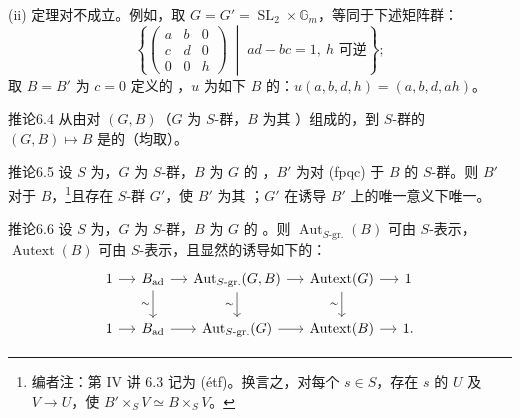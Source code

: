 (ii) 定理对不成立。例如，取 $G=G'=\operatorname{SL}_2\times\mathbb G_m$，等同于下述矩阵群：
\[\left\{\begin{pmatrix}a&b&0\\c&d&0\\0&0&h\end{pmatrix}\;\middle|\;ad-bc=1,\ h\text{ 可逆}\right\};\]
取 $B=B'$ 为 $c=0$ 定义的 ，$u$ 为如下 $B$ 的：$u(a,b,d,h)=(a,b,d,ah)$。
\begin{SGAresult}{推论}{6.4}
从由对 $(G,B)$（$G$ 为 $S$-群，$B$ 为其 ）组成的，到 $S$-群的 $(G,B)\mapsto B$ 是的（均取）。
\end{SGAresult}
\begin{SGAresult}{推论}{6.5}
设 $S$ 为，$G$ 为 $S$-群，$B$ 为 $G$ 的 ，$B'$ 为对 (fpqc) 于 $B$ 的 $S$-群。则 $B'$ 对于 $B$，\footnote{编者注：第 IV 讲 6.3 记为 (étf)。换言之，对每个 $s\in S$，存在 $s$ 的 $U$ 及 $V\to U$，使 $B'\times_SV\simeq B\times_SV$。}且存在 $S$-群 $G'$，使 $B'$ 为其 ；$G'$ 在诱导 $B'$ 上的唯一意义下唯一。
\end{SGAresult}
\begin{SGAresult}{推论}{6.6}
设 $S$ 为，$G$ 为 $S$-群，$B$ 为 $G$ 的 。则 $\operatorname{Aut}_{S\text{-gr.}}(B)$ 可由 $S$-表示，$\operatorname{Autext}(B)$ 可由 $S$-表示，且显然的诱导如下的：
\[
\begin{tikzcd}[column sep=small]
1\arrow[r]&B_{\mathrm{ad}}\arrow[r]\arrow[d,"\sim"']&\operatorname{Aut}_{S\text{-gr.}}(G,B)\arrow[r]\arrow[d,"\sim"']&\operatorname{Autext}(G)\arrow[r]\arrow[d,"\sim"']&1\\
1\arrow[r]&B_{\mathrm{ad}}\arrow[r]&\operatorname{Aut}_{S\text{-gr.}}(G)\arrow[r]&\operatorname{Autext}(B)\arrow[r]&1.
\end{tikzcd}
\]
\end{SGAresult}

